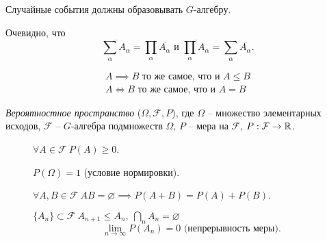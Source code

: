 \begin{remark}
  Случайные события должны образовывать $G$-алгебру.
\end{remark}

\begin{remark}
    Очевидно, что 
    \[
        \overline{\sum_{\alpha}A_{\alpha}}=\prod_{\alpha}\overline{A_{\alpha}} \text{ и } \overline{\prod_{\alpha}A_{\alpha}} = \sum_{\alpha}\overline{A_{\alpha}}.
    \]
\end{remark}

\begin{remark}
  \[
      \begin{array}{c}
          A \implies B \text{ то же самое, что и } A \leqslant B \\
          A \iff B \text{ то же самое, что и } A = B
      \end{array}
  \]
\end{remark}

\begin{definition}
    \emph{Вероятностное пространство} ($\Omega,\mathcal{F},P$), где $\Omega$ -- множество элементарных исходов, $\mathcal{F}$ -- $G$-алгебра подмножеств $\Omega$, $P$ -- мера на $\mathcal{F}$, $P: \mathcal{F} \rightarrow \mathbb{R} $.
  \begin{description}
        \item[] $\forall A \in \mathcal{F} \ P(A) \geqslant 0$.
        \item[] $P(\Omega) = 1$ (условие нормировки). 
        \item[] $\forall A,B \in \mathcal{F} \ AB = \varnothing \implies P(A+B) = P(A) + P(B)$.
        \item[] $\{A_{n}\}\subset \mathcal{F} \ A_{n+1} \leqslant A_n, \ \bigcap_n A_n = \varnothing$
        \[
            \lim_{n \rightarrow \infty}P(A_n) = 0 \text{ (непрерывность меры)}. 
        \]
  \end{description}
\end{definition}

